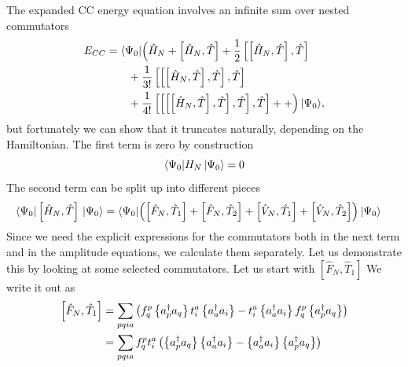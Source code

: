         The expanded CC energy equation involves an infinite sum over nested commutators
        \begin{align*}
            E_{CC} &= \langle \Psi_0|\Bigl( \hat{H}_N + \left[ \hat{H}_N, \hat{T} \right] +
                \frac{1}{2} \left[\left[ \hat{H}_N, \hat{T} \right], \hat{T}\right] \\
                & \qquad + \frac{1}{3!} \left[ \left[\left[ \hat{H}_N, \hat{T} \right], \hat{T}\right], \hat{T} \right] \\
                & \qquad + \frac{1}{4!} \left[ \left[ \left[\left[ \hat{H}_N, \hat{T} \right], \hat{T}\right], \hat{T} \right], \hat{T} \right] ++ \Bigr) \,|{\Psi_0}\rangle, \\
        \end{align*}
        but fortunately we can show that it truncates naturally, depending on the Hamiltonian.
        The first term is zero by construction
        \begin{equation*}
            \langle \Psi_0| H_N \,|{\Psi_0}\rangle = 0
        \end{equation*}       
     The second term can be split up into different pieces
        \begin{align*}
        \langle \Psi_0|\left[ \hat{H}_N, \hat{T} \right]\,|{\Psi_0}\rangle & = 
            \langle \Psi_0| \Bigl(\left[ \hat{F}_N, \hat{T}_1 \right] + \left[ \hat{F}_N, \hat{T}_2 \right]
            + \left[ \hat{V}_N, \hat{T}_1 \right] + \left[ \hat{V}_N, \hat{T}_2 \right] \Bigr) \,|{\Psi_0}\rangle
    \end{align*}
    Since we need the explicit expressions for the commutators both in the next term and in the amplitude equations, we calculate them separately.
Let us demonstrate this by looking at some selected commutators. Let us start with $\left[ \hat{F}_N, \hat{T}_1 \right]$
We write it out as
    \begin{align*}
        \left[ \hat{F}_N, \hat{T}_1 \right] &= \sum_{pqia} \left(f_q^p \left\{a_p^\dagger a_q\right\} 
            t_i^a \left\{a_a^\dagger a_i\right\} - t_i^a \left\{a_a^\dagger a_i\right\} f_q^p \left\{a_p^\dagger a_q\right\} \right) \\
        &= \sum_{pqia} f_q^p t_i^a \left( \left\{a_p^\dagger a_q\right\} \left\{a_a^\dagger a_i\right\} -
                \left\{a_a^\dagger a_i\right\} \left\{a_p^\dagger a_q\right\} \right)
    \end{align*}
